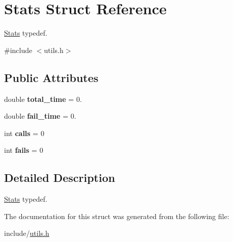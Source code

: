 \hypertarget{structStats}{}\section{Stats Struct Reference}
\label{structStats}


\hyperlink{structStats}{Stats} typedef.  




{\ttfamily \#include $<$utils.\+h$>$}

\subsection*{Public Attributes}
\begin{DoxyCompactItemize}
\item 
\mbox{\label{structStats_a70d36c1b69ef6756355c1203bc705c55}} 
double {\bfseries total\+\_\+time} = 0.
\item 
\mbox{\label{structStats_aee859c4519969281cad6bf9ea94deb9a}} 
double {\bfseries fail\+\_\+time} = 0.
\item 
\mbox{\label{structStats_a14faefc9acb2ce7d266c3673e37da7ee}} 
int {\bfseries calls} = 0
\item 
\mbox{\label{structStats_a24c80aca6cdab995eadceaec3a0a4803}} 
int {\bfseries fails} = 0
\end{DoxyCompactItemize}


\subsection{Detailed Description}
\hyperlink{structStats}{Stats} typedef. 

The documentation for this struct was generated from the following file\+:\begin{DoxyCompactItemize}
\item 
include/\hyperlink{utils_8h}{utils.\+h}\end{DoxyCompactItemize}
